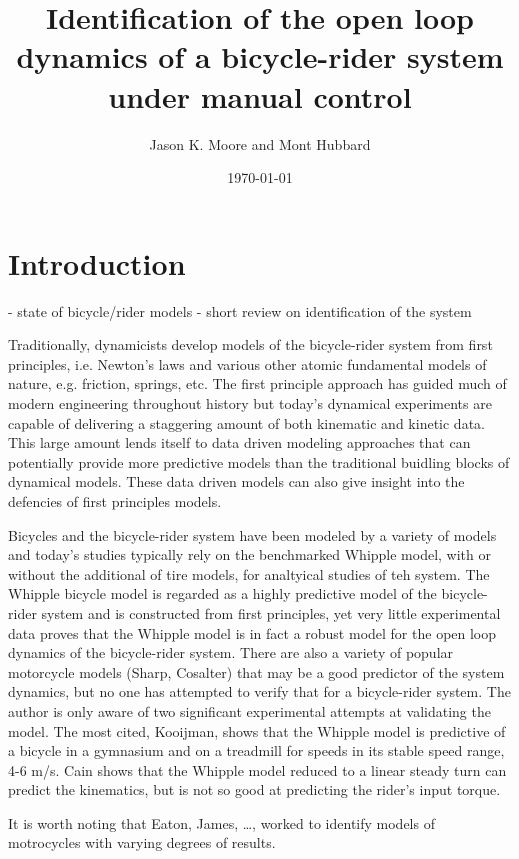 \documentclass{article}
\title{Identification of the open loop dynamics of a bicycle-rider system
under manual control}
\author{Jason K. Moore and Mont Hubbard}
\date{\today}
\begin{document}
\maketitle

\section{Introduction}

- state of bicycle/rider models
- short review on identification of the system

Traditionally, dynamicists develop models of the bicycle-rider system from
first principles, i.e. Newton's laws and various other atomic fundamental
models of nature, e.g. friction, springs, etc. The first principle approach has
guided much of modern engineering throughout history but today's dynamical
experiments are capable of delivering a staggering amount of both kinematic and
kinetic data. This large amount lends itself to data driven modeling
approaches that can potentially provide more predictive models than the
traditional buidling blocks of dynamical models. These data driven models can
also give insight into the defencies of first principles models.

Bicycles and the bicycle-rider system have been modeled by a variety of models
and today's studies typically rely on the benchmarked Whipple model, with or
without the additional of tire models, for analtyical studies of teh system.
The Whipple bicycle model is regarded as a highly predictive model of the
bicycle-rider system and is constructed from first principles, yet very little
experimental data proves that the Whipple model is in fact a robust model for
the open loop dynamics of the bicycle-rider system. There are also a variety of
popular motorcycle models (Sharp, Cosalter) that may be a good predictor of the
system dynamics, but no one has attempted to verify that for a bicycle-rider
system. The author is only aware of two significant experimental attempts at
validating the model. The most cited, Kooijman, shows that the Whipple model is
predictive of a  bicycle in a gymnasium and on a treadmill for
speeds in its stable speed range, 4-6 m/s. Cain shows that the Whipple model
reduced to a linear steady turn can predict the kinematics, but is not so good
at predicting the rider's input torque.

It is worth noting that Eaton, James, \ldots, worked to identify models of
motrocycles with varying degrees of results.
\end{document}
